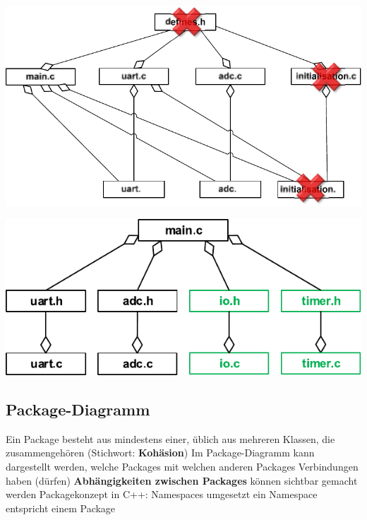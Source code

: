 \begin{minipage}[t]{0.48\columnwidth}
    \includegraphics[width=\columnwidth, align=t]{images/modulaisierung_bsp_schlecht.pdf}
\end{minipage}
\hfill
\begin{minipage}[t]{0.48\columnwidth}
    \includegraphics[width=\columnwidth, align=t]{images/modulaisierung_bsp_gut.pdf}
\end{minipage}

\vspace{-0.2cm}


\subsection{Package-Diagramm}

\begin{outline}
    \1 Ein Package besteht aus mindestens einer, üblich aus mehreren Klassen, die zusammengehören (Stichwort: \textbf{Kohäsion})
    \1 Im Package-Diagramm kann dargestellt werden, welche Packages mit welchen anderen Packages Verbindungen haben (dürfen) 
        \2 \textbf{Abhängigkeiten zwischen Packages} können sichtbar gemacht werden
    \1 Packagekonzept in C++: Namespaces umgesetzt
        \2 ein Namespace entspricht einem Package
\end{outline}


